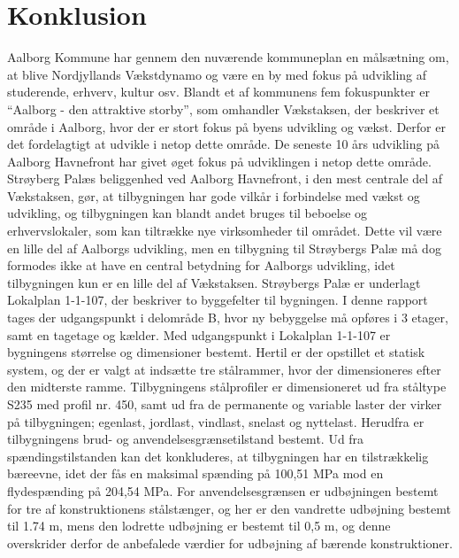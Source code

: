 \chapter{Konklusion}
 Aalborg Kommune har gennem den nuværende kommuneplan en målsætning om, at blive Nordjyllands Vækstdynamo og være en by med fokus på udvikling af studerende, erhverv, kultur osv. Blandt et af kommunens fem fokuspunkter er “Aalborg - den attraktive storby”, som omhandler Vækstaksen, der beskriver et område i Aalborg, hvor der er stort fokus på byens udvikling og vækst. Derfor er det fordelagtigt at udvikle i netop dette område.
 \newline \indent{     }  De seneste 10 års udvikling på Aalborg Havnefront har givet øget fokus på udviklingen i netop dette område. Strøyberg Palæs beliggenhed ved Aalborg Havnefront, i den mest centrale del af Vækstaksen, gør, at tilbygningen har gode vilkår i forbindelse med vækst og udvikling, og tilbygningen kan blandt andet bruges til beboelse og erhvervslokaler, som kan tiltrække nye virksomheder til området. Dette vil være en lille del af Aalborgs udvikling, men en tilbygning til Strøybergs Palæ må dog formodes ikke at have en central betydning for Aalborgs udvikling, idet tilbygningen kun er en lille del af Vækstaksen.
 \newline \indent{     }  Strøybergs Palæ er underlagt Lokalplan 1-1-107, der beskriver to byggefelter til bygningen. I denne rapport tages der udgangspunkt i delområde B, hvor ny bebyggelse må opføres i 3 etager, samt en tagetage og kælder. Med udgangspunkt i Lokalplan 1-1-107 er bygningens størrelse og dimensioner bestemt. Hertil er der opstillet et statisk system, og der er valgt at indsætte tre stålrammer, hvor der dimensioneres efter den midterste ramme.
 \newline \indent{     }  Tilbygningens stålprofiler er dimensioneret ud fra ståltype S235 med profil nr. 450, samt ud fra de permanente og variable laster der virker på tilbygningen; egenlast, jordlast, vindlast, snelast og nyttelast. Herudfra er tilbygningens brud- og anvendelsesgrænsetilstand bestemt.
 \newline \indent{     }  Ud fra spændingstilstanden kan det konkluderes, at tilbygningen har en tilstrækkelig bæreevne, idet der fås en maksimal spænding på 100,51 MPa mod en flydespænding på 204,54 MPa. 
 \newline \indent{     }  For anvendelsesgrænsen er udbøjningen bestemt for tre af konstruktionens stålstænger, og her er den vandrette udbøjning bestemt til 1.74 m, mens den lodrette udbøjning er bestemt til 0,5 m, og denne overskrider derfor de anbefalede værdier for udbøjning af bærende konstruktioner. 
